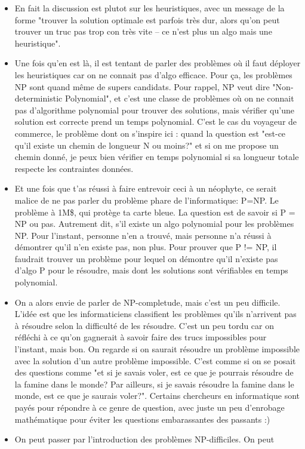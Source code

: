 \documentclass{article}
\begin{document}
\begin{itemize}
\begin{itemize}
\item En fait la discussion est plutot sur les heuristiques, avec un message de
la forme "trouver la solution optimale est parfois très dur, alors qu'on peut
trouver un truc pas trop con très vite -- ce n'est plus un algo mais une
heuristique".
\item Une fois qu'en est là, il est tentant de parler des problèmes où il faut
déployer les heuristiques car on ne connait pas d'algo efficace. Pour ça, les
problèmes NP sont quand même de supers candidats. Pour rappel, NP veut dire
"Non-deterministic Polynomial", et c'est une classe de problèmes où on ne
connait pas d'algorithme polynomial pour trouver des solutions, mais vérifier
qu'une solution est correcte prend un temps polynomial. C'est le cas du
voyageur de commerce, le problème dont on s'inspire ici : quand la question est
"est-ce qu'il existe un chemin de longueur N ou moins?" et si on me propose un
chemin donné, je peux bien vérifier en temps polynomial si sa longueur totale
respecte les contraintes données.
\item Et une fois que t'as réussi à faire entrevoir ceci à un néophyte, ce
serait malice de ne pas parler du problème phare de l'informatique: P=NP. Le
problème à 1M\$, qui protège ta carte bleue. La question est de savoir si P =
NP ou pas. Autrement dit, s'il existe un algo polynomial pour les problèmes NP.
Pour l'instant, personne n'en a trouvé, mais personne n'a réussi à démontrer
qu'il n'en existe pas, non plus. Pour prouver que P != NP, il faudrait trouver
un problème pour lequel on démontre qu'il n'existe pas d'algo P pour le
résoudre, mais dont les solutions sont vérifiables en temps polynomial.
\item On a alors envie de parler de NP-completude, mais c'est un peu difficile.
L'idée est que les informaticiens classifient les problèmes qu'ils n'arrivent
pas à résoudre selon la difficulté de les résoudre. C'est un peu tordu car on
réfléchi à ce qu'on gagnerait à savoir faire des trucs impossibles pour
l'instant, mais bon. On regarde si on saurait résoudre un problème impossible
avec la solution d'un autre problème impossible. C'est comme si on se posait
des questions comme "et si je savais voler, est ce que je pourrais résoudre de
la famine dans le monde? Par ailleurs, si je savais résoudre la famine dans le
monde, est ce que je saurais voler?". Certains chercheurs en informatique sont
payés pour répondre à ce genre de question, avec juste un peu d'enrobage
mathématique pour éviter les questions embarassantes des passants :)
\item On peut passer par l'introduction des problèmes NP-difficiles. On peut

\end{itemize}
\end{itemize}
\end{document}
